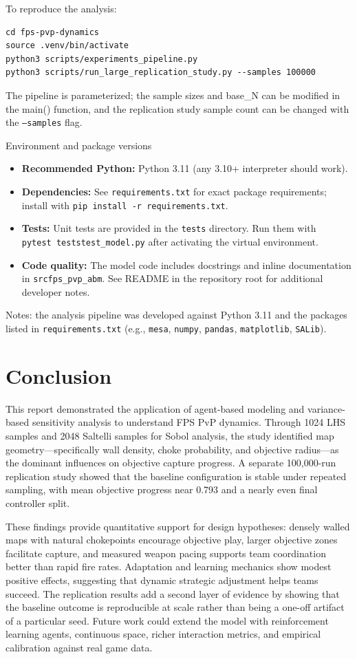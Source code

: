 \documentclass{assignment}
\begin{document}
To reproduce the analysis:
\begin{lstlisting}
cd fps-pvp-dynamics
source .venv/bin/activate
python3 scripts/experiments_pipeline.py
python3 scripts/run_large_replication_study.py --samples 100000
\end{lstlisting}

The pipeline is parameterized; the sample sizes and base\_N can be modified in the main() function, and the replication study sample count can be changed with the \texttt{--samples} flag.

Environment and package versions
\begin{itemize}
  \item \textbf{Recommended Python:} Python 3.11 (any 3.10+ interpreter should work).
  \item \textbf{Dependencies:} See \texttt{requirements.txt} for exact package requirements; install with \texttt{pip install -r requirements.txt}.
  \item \textbf{Tests:} Unit tests are provided in the \texttt{tests\/} directory. Run them with \texttt{pytest\ tests\/test\_model.py} after activating the virtual environment.
  \item \textbf{Code quality:} The model code includes docstrings and inline documentation in \texttt{src\/fps\_pvp\_abm\/}. See README in the repository root for additional developer notes.
\end{itemize}

Notes: the analysis pipeline was developed against Python 3.11 and the packages listed in \texttt{requirements.txt} (e.g., \texttt{mesa}, \texttt{numpy}, \texttt{pandas}, \texttt{matplotlib}, \texttt{SALib}). 


\section{Conclusion}

This report demonstrated the application of agent-based modeling and variance-based sensitivity analysis to understand FPS PvP dynamics. Through 1024 LHS samples and 2048 Saltelli samples for Sobol analysis, the study identified map geometry—specifically wall density, choke probability, and objective radius—as the dominant influences on objective capture progress. A separate 100,000-run replication study showed that the baseline configuration is stable under repeated sampling, with mean objective progress near 0.793 and a nearly even final controller split.

These findings provide quantitative support for design hypotheses: densely walled maps with natural chokepoints encourage objective play, larger objective zones facilitate capture, and measured weapon pacing supports team coordination better than rapid fire rates. Adaptation and learning mechanics show modest positive effects, suggesting that dynamic strategic adjustment helps teams succeed. The replication results add a second layer of evidence by showing that the baseline outcome is reproducible at scale rather than being a one-off artifact of a particular seed. Future work could extend the model with reinforcement learning agents, continuous space, richer interaction metrics, and empirical calibration against real game data.
\end{document}
